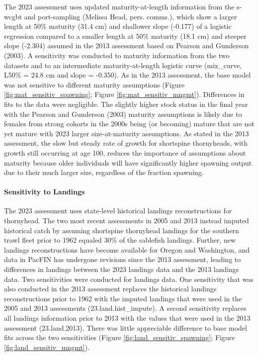 \documentclass[11pt,
  english,
  letterpaper,
]{article}
\begin{document}
The 2023 assessment uses updated maturity-at-length information from the \gls{s-wcgbt} and port-sampling (Melissa Head, pers. comms.), which show a larger length at 50\% maturity (31.4 cm) and shallower slope (-0.177) of a logistic regression compared to a smaller length at 50\% maturity (18.1 cm) and steeper slope (-2.304) assumed in the 2013 assessment based on Pearson and Gunderson (2003). A sensitivity was conducted to maturity information from the two datasets and to an intermediate maturity-at-length logistic curve (mix\_curve, L50\% = 24.8 cm and slope = -0.350). As in the 2013 assessment, the base model was not sensitive to different maturity assumptions (Figure \ref{fig:mat_sensitiv_spawning}; Figure \ref{fig:mat_sensitiv_mngmt}). Differences in fits to the data were negligible. The slightly higher stock status in the final year with the Pearson and Gunderson (2003) maturity assumptions is likely due to females from strong cohorts in the 2000s being (or becoming) mature that are not yet mature with 2023 larger size-at-maturity assumptions. As stated in the 2013 assessment, the slow but steady rate of growth for shortspine thornyheads, with growth still occurring at age 100, reduces the importance of assumptions about maturity because older individuals will have significantly higher spawning output due to their much larger size, regardless of the fraction spawning.

\hypertarget{sensitivity-to-landings}{%
\paragraph{Sensitivity to Landings}\label{sensitivity-to-landings}}

The 2023 assessment uses state-level historical landings reconstructions for thornyhead. The two most recent assessments in 2005 and 2013 instead imputed historical catch by assuming shortspine thornyhead landings for the southern trawl fleet prior to 1962 equaled 30\% of the sablefish landings. Further, new landings reconstructions have become available for Oregon and Washington, and data in PacFIN has undergone revisions since the 2013 assessment, leading to differences in landings between the 2023 landings data and the 2013 landings data. Two sensitivities were conducted for landings data. One sensitivity that was also conducted in the 2013 assessment replaces the historical landings reconstructions prior to 1962 with the imputed landings that were used in the 2005 and 2013 assessments (23.land.hist\_impute). A second sensitivity replaces all landings information prior to 2013 with the values that were used in the 2013 assessment (23.land.2013). There was little appreciable difference to base model fits across the two sensitivities (Figure \ref{fig:land_sensitiv_spawning}; Figure \ref{fig:land_sensitiv_mngmt}).
\end{document}
